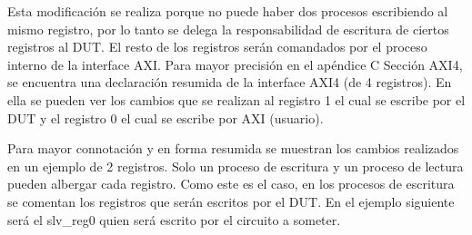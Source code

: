 \documentclass[a4paper,openright,12pt]{report}
\begin{document}
 Esta modificación se realiza porque no puede haber dos procesos escribiendo al mismo registro, por lo tanto se delega la responsabilidad de escritura de ciertos registros al DUT. El resto de los registros serán comandados por el proceso interno de la interface AXI. Para mayor precisión en el apéndice C Sección AXI4, se encuentra una declaración resumida de la interface AXI4 (de 4 registros). En ella se pueden ver los cambios que se realizan al registro 1 el cual se escribe por el DUT y el registro 0 el cual se escribe  por AXI (usuario). 
 
 Para mayor connotación y en forma resumida se muestran los cambios realizados en un ejemplo de 2 registros. Solo un proceso de escritura y un proceso de lectura pueden albergar cada registro. Como este es el caso, en los procesos de escritura se comentan los registros que serán escritos por el DUT. En el ejemplo siguiente será el slv\_reg0 quien será escrito por el circuito a someter.
 
   
   
\end{document}
